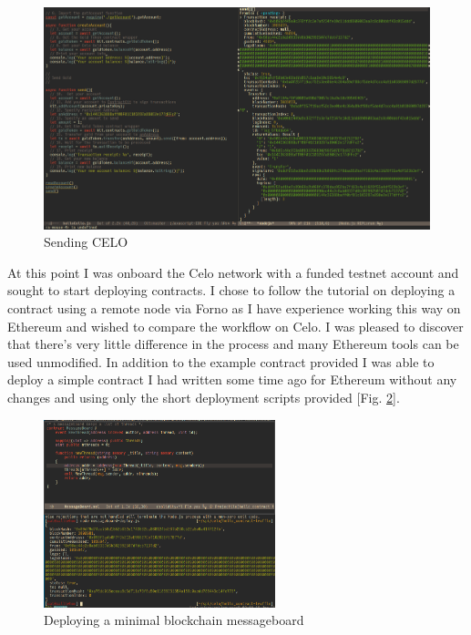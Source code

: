 \documentclass[a4paper,11pt]{article}
\begin{document}
\begin{figure}[hbt!]
  \centering
  \includegraphics[width=\textwidth]{sending}
  \caption{Sending CELO}
  \label{fig:sending}
\end{figure}

At this point I was onboard the Celo network with a funded testnet account and
sought to start deploying contracts.  I chose to follow the tutorial on
deploying a contract using a remote node via Forno as I have experience
working this way on Ethereum and wished to compare the workflow on Celo.  I was
pleased to discover that there's very little difference in the process and many
Ethereum tools can be used unmodified.  In addition to the example contract
provided I was able to deploy a simple contract I had written some time ago for
Ethereum without any changes and using only the short deployment scripts
provided [Fig. \ref{fig:messageboard}].\\

\newpage

\begin{figure}[hbt!]
  \centering
  \includegraphics[width=0.6\textwidth]{deploy-messageboard}
  \caption{Deploying a minimal blockchain messageboard}
  \label{fig:messageboard}
\end{figure}
\end{document}
